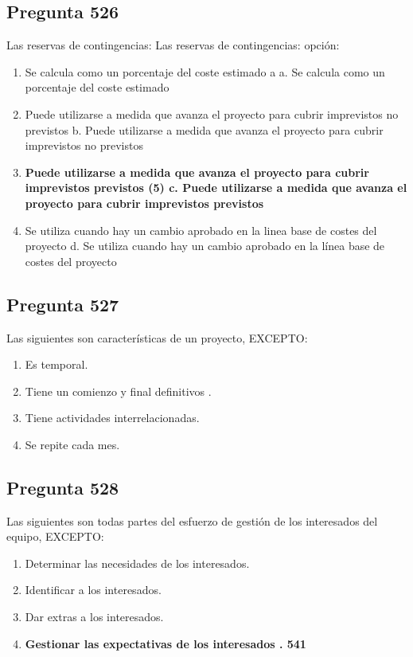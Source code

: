 \documentclass[11pt,a4paper]{article}
\begin{document}
\subsection*{Pregunta 526}
Las reservas de contingencias: Las reservas de contingencias: opción:

\begin{enumerate}[label=\alph*)]
  \item Se calcula como un porcentaje del coste estimado a a. Se calcula como un porcentaje del coste estimado
  \item Puede utilizarse a medida que avanza el proyecto para cubrir imprevistos no previstos b. Puede utilizarse a medida que avanza el proyecto para cubrir imprevistos no previstos
  \item \textbf{Puede utilizarse a medida que avanza el proyecto para cubrir imprevistos previstos (5) c. Puede utilizarse a medida que avanza el proyecto para cubrir imprevistos previstos}
  \item Se utiliza cuando hay un cambio aprobado en la linea base de costes del proyecto d. Se utiliza cuando hay un cambio aprobado en la línea base de costes del proyecto
\end{enumerate}

\subsection*{Pregunta 527}
Las siguientes son características de un proyecto, EXCEPTO:

\begin{enumerate}[label=\alph*)]
  \item Es temporal.
  \item Tiene un comienzo y final definitivos .
  \item Tiene actividades interrelacionadas.
  \item Se repite cada mes.
\end{enumerate}

\subsection*{Pregunta 528}
Las siguientes son todas partes del esfuerzo de gestión de los interesados del equipo, EXCEPTO:

\begin{enumerate}[label=\alph*)]
  \item Determinar las necesidades de los interesados.
  \item Identificar a los interesados.
  \item Dar extras a los interesados.
  \item \textbf{Gestionar las expectativas de los interesados . 541}
\end{enumerate}
\end{document}
